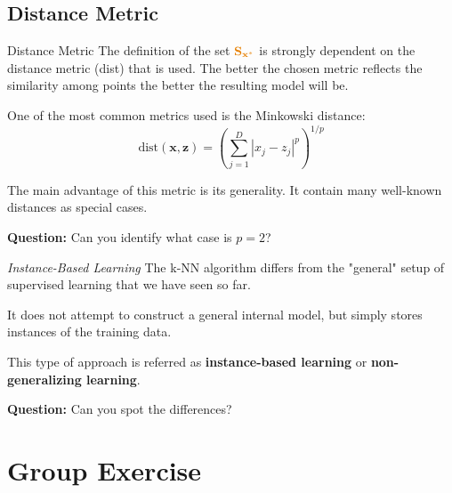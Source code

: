 \documentclass[aspectratio=169,10pt]{beamer}
\begin{document}
\subsection{Distance Metric}
\begin{frame}{Distance Metric}
	The definition of the set $\knnset_\unseenx$ is strongly dependent on the distance metric (dist) that is used. The better the chosen metric reflects the similarity among points the better the resulting model will be.
	
	\pause
	One of the most common metrics used is the Minkowski distance:
	\begin{equation}
		\text{dist}(\textbf{x},\textbf{z}) = \left( \sum_{j=1}^D |x_j -z_j|^p\right)^{1/p}
	\end{equation}

	\pause
	The main advantage of this metric is its generality. It contain many well-known distances as special cases.
	
	\alert{\textbf{Question:}} Can you identify what case is $p=2$? 
	
\end{frame}
	

\begin{frame}{\textit{Instance-Based Learning}}
	The k-NN algorithm differs from the "general" setup of supervised learning that we have seen so far. 
	
	\pause
	\vspace{0.4cm}
	It does not attempt to construct a general internal model, but simply stores instances of the training data.
	
	\pause
	\vspace{0.4cm}
	This type of approach is referred as 	\alert{\textbf{instance-based learning}} or \alert{\textbf{non-generalizing learning}}.
	
	\centering
	\vspace{0.4cm}
	\alert{\textbf{Question:}} Can you spot the differences?
	
\end{frame}

\section{Group Exercise}

%
%   
\end{document}
